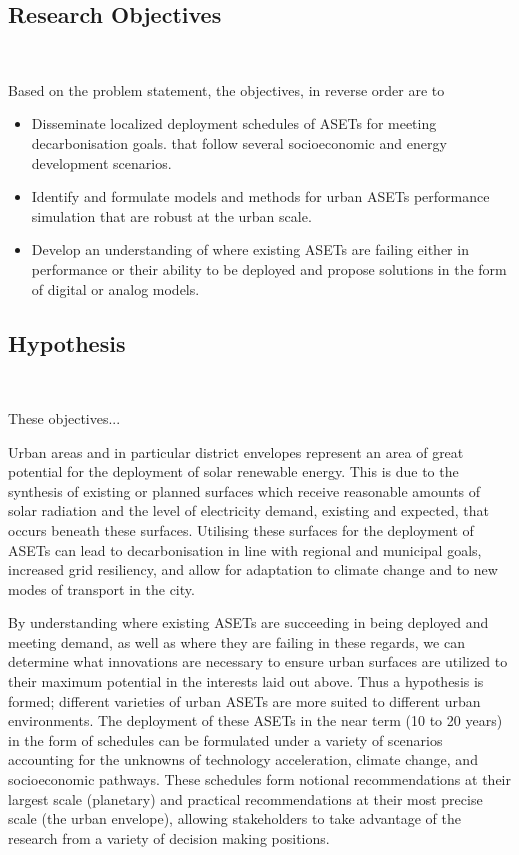 \subsection{Research Objectives}\

Based on the problem statement, the objectives, in reverse order are to

\begin{itemize}
	\item Disseminate localized deployment schedules of ASETs for meeting decarbonisation goals. that follow several socioeconomic and energy development scenarios.
	\item Identify and formulate models and methods for urban ASETs performance simulation that are robust at the urban scale. 
	\item Develop an understanding of where existing ASETs are failing either in performance or their ability to be deployed and propose solutions in the form of digital or analog models.
\end{itemize}

\subsection{Hypothesis}\

These objectives...

Urban areas and in particular district envelopes represent an area of great potential for the deployment of solar renewable energy. This is due to the synthesis of existing or planned surfaces which receive reasonable amounts of solar radiation and the level of electricity demand, existing and expected, that occurs beneath these surfaces. Utilising these surfaces for the deployment of ASETs can lead to decarbonisation in line with regional and municipal goals, increased grid resiliency, and allow for adaptation to climate change and to new modes of transport in the city.

By understanding where existing ASETs are succeeding in being deployed and meeting demand, as well as where they are failing in these regards, we can determine what innovations are necessary to ensure urban surfaces are utilized to their maximum potential in the interests laid out above. Thus a hypothesis is formed; different varieties of urban ASETs are more suited to different urban environments. The deployment of these ASETs in the near term (10 to 20 years) in the form of schedules can be formulated under a variety of scenarios accounting for the unknowns of technology acceleration, climate change, and socioeconomic pathways. These schedules form notional recommendations at their largest scale (planetary) and practical recommendations at their most precise scale (the urban envelope), allowing stakeholders to take advantage of the research from a variety of decision making positions.

